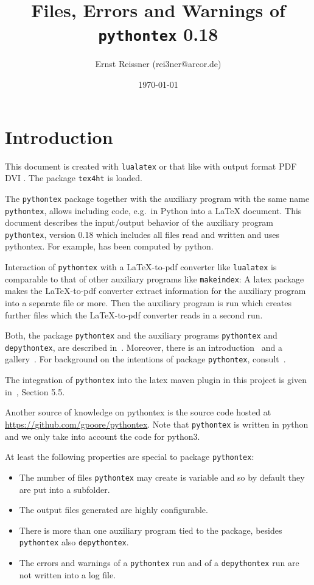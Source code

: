 \documentclass[a4paper, english]{article}%
\title{Files, Errors and Warnings of \texttt{pythontex} 0.18 }
\author{Ernst Reissner (rei3ner@arcor.de)}
\date{\today}
\newcommand{\lualatex}{\texttt{lualatex}}
\newcommand{\makeIndex}{\texttt{makeindex}}
\newcommand{\pytex}{\texttt{pythontex}}
\newcommand{\Ppytex}{package \texttt{pythontex}}
\newcommand{\pytexP}{\texttt{pythontex} package}
\newcommand{\dpytex}{\texttt{depythontex}}
\begin{document}
\maketitle
\tableofcontents
\listoffigures
\listoftables
\lstlistoflistings%

\section{Introduction}

This document is created with \lualatex{} or that like 
with output format 
\ifpdf%
PDF%
\else
DVI%
\fi.
The package \texttt{tex4ht} 
is  loaded. 

The \pytexP{} together with the auxiliary program with the same name \pytex{}, 
allows including code, e.g.~in Python into a \LaTeX{} document. 
This document describes the input/output behavior of the auxiliary program \pytex{}, version 0.18
which includes all files read and written and uses pythontex. 
For example, \texttt{} has been computed by python. 

Interaction of \pytex{} with a \LaTeX-to-pdf converter like \lualatex{} 
is comparable to that of other auxiliary programs like \makeIndex: 
A latex package makes the \LaTeX-to-pdf converter extract information for the auxiliary program 
into a separate file or more. 
Then the auxiliary program is run which creates further files 
which the \LaTeX-to-pdf converter reads in a second run. 

Both, the package \texttt{pythontex} and the auxiliary programs \pytex{} and \dpytex{}, 
are described in~\cite{PythonTexP}. 
Moreover, there is an introduction~\cite{PythonTexQ} and a gallery~\cite{PythonTexG}. 
For background on the intentions of package \texttt{pythontex}, consult~\cite{PythonTexRepr}. 

The integration of \texttt{pythontex} into the latex maven plugin in this project 
is given in~\cite{LatexPlugin}, Section 5.5. 

Another source of knowledge on pythontex is the source code hosted at 
\url{https://github.com/gpoore/pythontex}. 
Note that \texttt{pythontex} is written in python and we only take into account the code for python3. 

At least the following properties are special to \Ppytex: 
%
\begin{itemize}
  \item The number of files \pytex{} may create is variable 
  and so by default they are put into a subfolder. 
  \item The output files generated are highly configurable. 
  \item There is more than one auxiliary program tied to the package, besides \pytex{} also \dpytex{}. 
  \item The errors and warnings of a \pytex{} run and of a \dpytex{} run are not written into a log file. 
\end{itemize}
\end{document}
